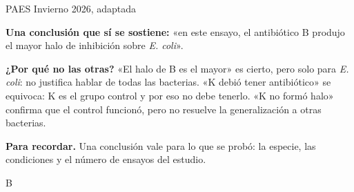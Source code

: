 \begin{elejemplo}{PAES Invierno 2026, adaptada}
{\textbf{Una conclusión que sí se sostiene:} «en este ensayo, el antibiótico B produjo el mayor halo de inhibición sobre \emph{E. coli}».

\textbf{¿Por qué no las otras?} «El halo de B es el mayor» es cierto, pero solo para \emph{E. coli}: no justifica hablar de todas las bacterias. «K debió tener antibiótico» se equivoca: K es el grupo control y por eso no debe tenerlo. «K no formó halo» confirma que el control funcionó, pero no resuelve la generalización a otras bacterias.

\textbf{\color{cienciaD}Para recordar.} Una conclusión vale para lo que se probó: la especie, las condiciones y el número de ensayos del estudio.}{B}
\end{elejemplo}
